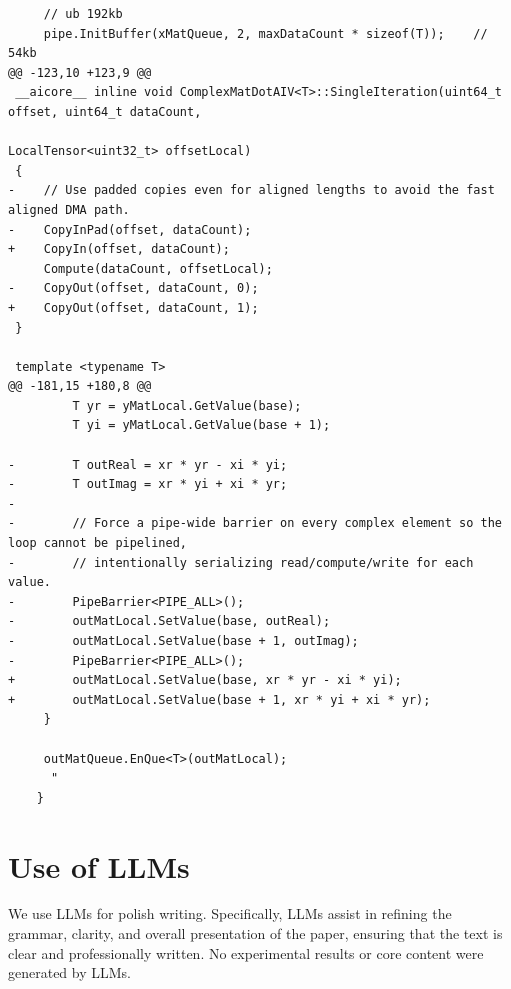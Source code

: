 \documentclass{article}
\theoremstyle{plain}
\theoremstyle{definition}
\theoremstyle{remark}
\begin{document}
\begin{tcolorbox}
\begin{lstlisting}
     // ub 192kb
     pipe.InitBuffer(xMatQueue, 2, maxDataCount * sizeof(T));    // 54kb
@@ -123,10 +123,9 @@
 __aicore__ inline void ComplexMatDotAIV<T>::SingleIteration(uint64_t offset, uint64_t dataCount,
                                                             LocalTensor<uint32_t> offsetLocal)
 {
-    // Use padded copies even for aligned lengths to avoid the fast aligned DMA path.
-    CopyInPad(offset, dataCount);
+    CopyIn(offset, dataCount);
     Compute(dataCount, offsetLocal);
-    CopyOut(offset, dataCount, 0);
+    CopyOut(offset, dataCount, 1);
 }
 
 template <typename T>
@@ -181,15 +180,8 @@
         T yr = yMatLocal.GetValue(base);
         T yi = yMatLocal.GetValue(base + 1);
 
-        T outReal = xr * yr - xi * yi;
-        T outImag = xr * yi + xi * yr;
-
-        // Force a pipe-wide barrier on every complex element so the loop cannot be pipelined,
-        // intentionally serializing read/compute/write for each value.
-        PipeBarrier<PIPE_ALL>();
-        outMatLocal.SetValue(base, outReal);
-        outMatLocal.SetValue(base + 1, outImag);
-        PipeBarrier<PIPE_ALL>();
+        outMatLocal.SetValue(base, xr * yr - xi * yi);
+        outMatLocal.SetValue(base + 1, xr * yi + xi * yr);
     }
 
     outMatQueue.EnQue<T>(outMatLocal);
      "
    }
\end{lstlisting}
\end{tcolorbox}
\label{fig:appendix_optimization_thought}

\section{Use of LLMs}\label{sec:llm}
We use LLMs for polish writing. 
Specifically, LLMs assist in refining the grammar, clarity, and overall presentation of the paper, ensuring that the text is clear and professionally written. 
No experimental results or core content were generated by LLMs.
\end{document}
